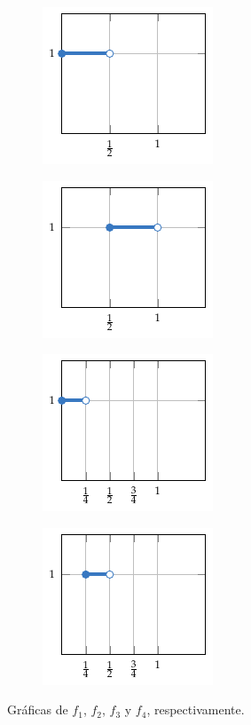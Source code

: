 \documentclass[a4paper, 11pt, oneside]{report}
\begin{document}
\begin{example}
  \begin{figure}[H]
    \centering
    \begin{subfigure}[b]{0.24\textwidth}
      \centering
      \includegraphics{./plot4/main.pdf}
    \end{subfigure}
    \begin{subfigure}[b]{0.24\textwidth}
      \centering
      \includegraphics{./plot5/main.pdf}
    \end{subfigure}
    \begin{subfigure}[b]{0.24\textwidth}
      \centering
      \includegraphics{./plot6/main.pdf}
    \end{subfigure}
    \begin{subfigure}[b]{0.24\textwidth}
      \centering
      \includegraphics{./plot7/main.pdf}
    \end{subfigure}
    \caption{Gráficas de $f_1$, $f_2$, $f_3$ y $f_4$, respectivamente.}
  \end{figure}

\end{example}
\end{document}
